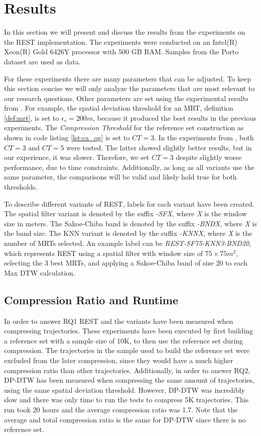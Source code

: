 \chapter{Results}
\label{chap:res}
In this section we will present and discuss the results from the experiments on the REST implementation. The experiments were conducted on an Intel(R) Xeon(R) Gold 6426Y processor with 500 GB RAM. Samples from the Porto dataset are used as data.

For these experiments there are many parameters that can be adjusted. To keep this section concise we will only analyze the parameters that are most relevant to our research questions. Other parameters are set using the experimental results from \textcite{zhao2018rest}. For example, the spatial deviation threshold for an MRT, definition \ref{def:mrt}, is set to $\epsilon_s = 200 m$, because it produced the best results in the previous experiments. The \textit{Compression Threshold} for the reference set construction as shown in code listing \ref{lst:ca_og} is set to $CT = 3$. In the experiments from \textcite{zhao2018rest}, both $CT =3$ and $CT = 5$ were tested. The latter showed slightly better results, but in our experience, it was slower. Therefore, we set $CT = 3$ despite slightly worse performance, due to time constraints. Additionally, as long as all variants use the same parameter, the comparisons will be valid and likely hold true for both thresholds.

To describe different variants of REST, labels for each variant have been created. The spatial filter variant is denoted by the suffix \textit{-SFX}, where \textit{X} is the window size in meters. The Sakoe-Chiba band is denoted by the suffix \textit{-BNDX}, where \textit{X} is the band size. The KNN variant is denoted by the suffix \textit{-KNNX}, where \textit{X} is the number of MRTs selected. An example label can be \textit{REST-SF75-KNN3-BND20}, which represents REST using a spatial filter with window size of $75\times75 m^2$, selecting the 3 best MRTs, and applying a Sakoe-Chiba band of size 20 to each Max DTW calculation.

\section{Compression Ratio and Runtime}
In order to answer RQ1 REST and the variants have been measured when compressing trajectories. These experiments have been executed by first building a reference set with a sample size of 10K, to then use the reference set during compression. The trajectories in the sample used to build the reference set were excluded from the later compression, since they would have a much higher compression ratio than other trajectories. Additionally, in order to answer RQ2, DP-DTW has been measured when compressing the same amount of trajectories, using the same spatial deviation threshold. However, DP-DTW was incredibly slow and there was only time to run the tests to compress 5K trajectories. This run took 20 hours and the average compression ratio was 1.7. Note that the average and total compression ratio is the same for DP-DTW since there is no reference set.

